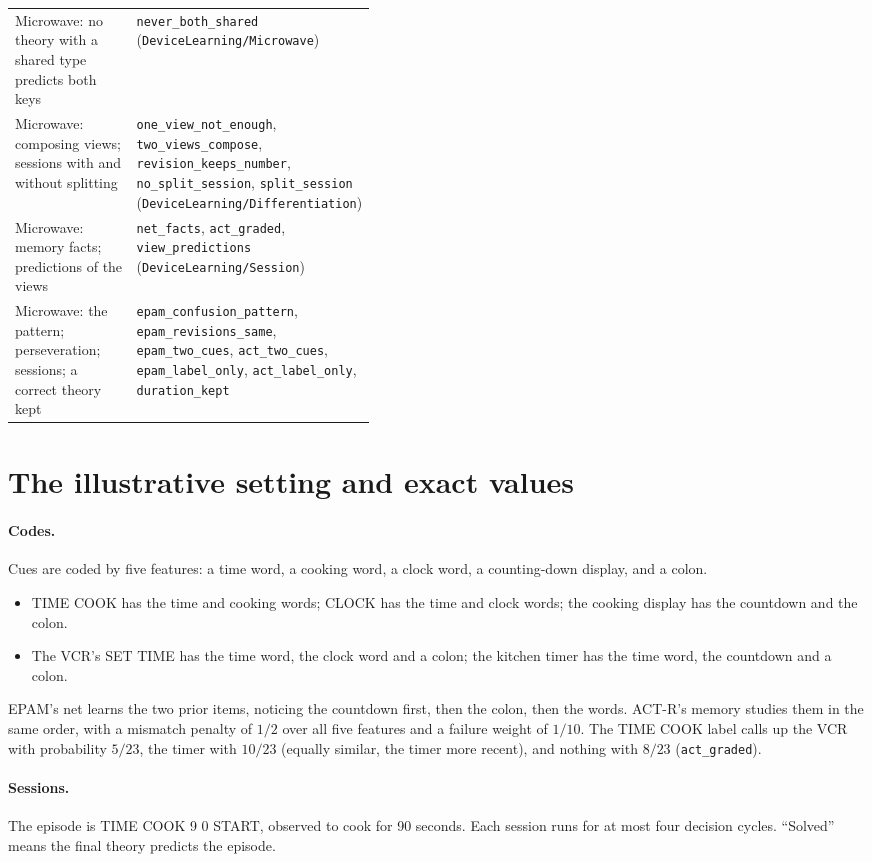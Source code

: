 \documentclass[11pt]{article}
\newcommand{\code}[1]{\texttt{#1}}
\newcommand{\lean}[1]{\texttt{#1}}
\begin{document}
\begin{table}[h]
\begin{tabularx}{\linewidth}{@{}>{\raggedright\arraybackslash}p{0.42\linewidth}>{\raggedright\arraybackslash}X@{}}
Microwave: no theory with a shared type predicts both keys & \lean{never\_both\_shared} (\code{DeviceLearning/Microwave}) \\
Microwave: composing views; sessions with and without splitting & \lean{one\_view\_not\_enough}, \lean{two\_views\_compose}, \lean{revision\_keeps\_number}, \lean{no\_split\_session}, \lean{split\_session} (\code{DeviceLearning/Differentiation}) \\
Microwave: memory facts; predictions of the views & \lean{net\_facts}, \lean{act\_graded}, \lean{view\_predictions} (\code{DeviceLearning/Session}) \\
Microwave: the pattern; perseveration; sessions; a correct theory kept & \lean{epam\_confusion\_pattern}, \lean{epam\_revisions\_same}, \lean{epam\_two\_cues}, \lean{act\_two\_cues}, \lean{epam\_label\_only}, \lean{act\_label\_only}, \lean{duration\_kept} \\
\bottomrule
\end{tabularx}
\end{table}

\section{The illustrative setting and exact values}
\label{app:setting}

\paragraph{Codes.} Cues are coded by five features: a time word, a cooking word, a clock word, a counting-down display, and a colon.
\begin{itemize}
  \item TIME COOK has the time and cooking words; CLOCK has the time and clock words; the cooking display has the countdown and the colon.
  \item The VCR's SET TIME has the time word, the clock word and a colon; the kitchen timer has the time word, the countdown and a colon.
\end{itemize}
EPAM's net learns the two prior items, noticing the countdown first, then the colon, then the words. ACT-R's memory studies them in the same order, with a mismatch penalty of $1/2$ over all five features and a failure weight of $1/10$. The TIME COOK label calls up the VCR with probability $5/23$, the timer with $10/23$ (equally similar, the timer more recent), and nothing with $8/23$ (\lean{act\_graded}).

\paragraph{Sessions.} The episode is TIME COOK 9 0 START, observed to cook for 90 seconds. Each session runs for at most four decision cycles. ``Solved'' means the final theory predicts the episode.
\end{document}
